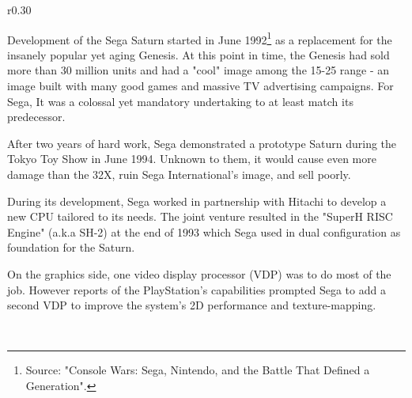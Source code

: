 \begin{wrapfigure}[10]{r}{0.30\textwidth}{
\centering {}}
\end{wrapfigure}
Development of the Sega Saturn started in June 1992\footnote{Source: "Console Wars: Sega, Nintendo, and the Battle That Defined a Generation".} as a replacement for the insanely popular yet aging Genesis. At this point in time, the Genesis had sold more than 30 million units and had a "cool" image among the 15-25 range - an image built with many good games and massive TV advertising campaigns. For Sega, It was a colossal yet mandatory undertaking to at least match its predecessor.\\
\label{saturn_port}
\par
After two years of hard work, Sega demonstrated a prototype Saturn during the Tokyo Toy Show in June 1994. Unknown to them, it would cause even more damage than the 32X, ruin Sega International's image, and sell poorly.\\
\par
During its development, Sega worked in partnership with Hitachi to develop a new CPU tailored to its needs. The joint venture resulted in the "SuperH RISC Engine" (a.k.a SH-2) at the end of 1993 which Sega used in dual configuration as foundation for the Saturn.\\
\par
 On the graphics side, one video display processor (VDP) was to do most of the job. However reports of the PlayStation's capabilities prompted Sega to add a second VDP to improve the system's 2D performance and texture-mapping.\\
\par
{}\\

